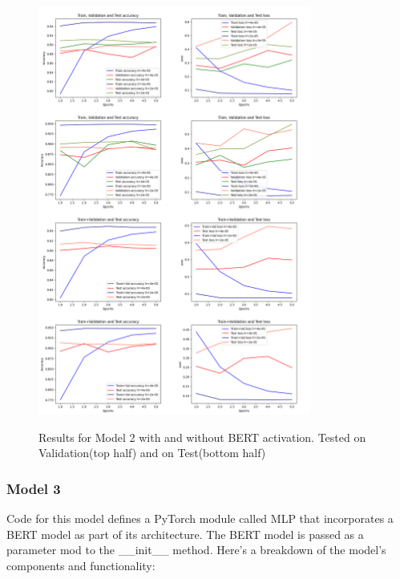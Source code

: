 \begin{center}
    \begin{figure}[!h]
        \centering
        \includegraphics[width=0.8\textwidth]{images/ger_model1_vertical.png}
        \label{fig:ger_model1}
        \caption{Results for Model 2 with and without BERT activation. Tested on Validation(top half) and on Test(bottom half)}
    \end{figure}
\end{center}


\subsubsection{Model 3}

Code for this model defines a PyTorch module called MLP that incorporates a BERT model as part of its architecture. The BERT model is passed as a parameter mod to the \_\_init\_\_ method. Here's a breakdown of the model's components and functionality:

